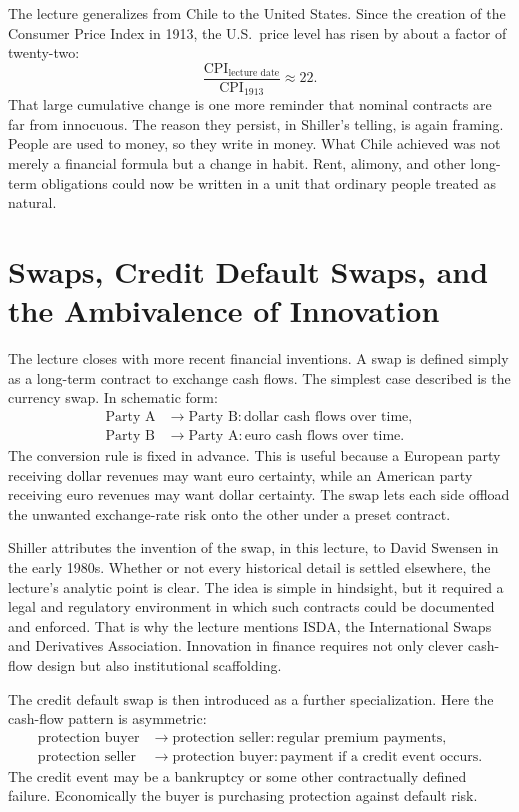 The lecture generalizes from Chile to the United States. Since the creation of the Consumer Price Index in 1913, the U.S.\ price level has risen by about a factor of twenty-two:
\begin{equation}
\frac{\mathrm{CPI}_{\text{lecture date}}}{\mathrm{CPI}_{1913}} \approx 22.
\end{equation}
That large cumulative change is one more reminder that nominal contracts are far from innocuous. The reason they persist, in Shiller's telling, is again framing. People are used to money, so they write in money. What Chile achieved was not merely a financial formula but a change in habit. Rent, alimony, and other long-term obligations could now be written in a unit that ordinary people treated as natural.

\section{Swaps, Credit Default Swaps, and the Ambivalence of Innovation}

The lecture closes with more recent financial inventions. A swap is defined simply as a long-term contract to exchange cash flows. The simplest case described is the currency swap. In schematic form:
\begin{align}
\text{Party A} &\rightarrow \text{Party B}: \text{dollar cash flows over time},\\
\text{Party B} &\rightarrow \text{Party A}: \text{euro cash flows over time}.
\end{align}
The conversion rule is fixed in advance. This is useful because a European party receiving dollar revenues may want euro certainty, while an American party receiving euro revenues may want dollar certainty. The swap lets each side offload the unwanted exchange-rate risk onto the other under a preset contract.

Shiller attributes the invention of the swap, in this lecture, to David Swensen in the early 1980s. Whether or not every historical detail is settled elsewhere, the lecture's analytic point is clear. The idea is simple in hindsight, but it required a legal and regulatory environment in which such contracts could be documented and enforced. That is why the lecture mentions ISDA, the International Swaps and Derivatives Association. Innovation in finance requires not only clever cash-flow design but also institutional scaffolding.

The credit default swap is then introduced as a further specialization. Here the cash-flow pattern is asymmetric:
\begin{align}
\text{protection buyer} &\rightarrow \text{protection seller}: \text{regular premium payments},\\
\text{protection seller} &\rightarrow \text{protection buyer}: \text{payment if a credit event occurs}.
\end{align}
The credit event may be a bankruptcy or some other contractually defined failure. Economically the buyer is purchasing protection against default risk.

